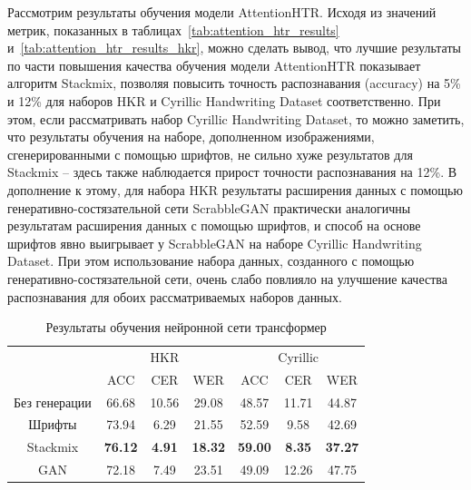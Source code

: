 Рассмотрим результаты обучения модели AttentionHTR.
Исходя из значений метрик, показанных в таблицах~\ref{tab:attention_htr_results} и~\ref{tab:attention_htr_results_hkr},
можно сделать вывод, что лучшие результаты по части повышения качества обучения модели AttentionHTR показывает алгоритм Stackmix,
позволяя повысить точность распознавания (accuracy) на 5\% и 12\% для наборов HKR и Cyrillic Handwriting Dataset соответственно.
При этом, если рассматривать набор Cyrillic Handwriting Dataset, то можно заметить,
что результаты обучения на наборе, дополненном изображениями, сгенерированными с помощью шрифтов,
не сильно хуже результатов для Stackmix -- здесь также наблюдается прирост точности распознавания на 12\%.
В дополнение к этому, для набора HKR результаты расширения данных с помощью генеративно-состязательной сети ScrabbleGAN
практически аналогичны результатам расширения данных с помощью шрифтов, и способ на основе шрифтов явно выигрывает у ScrabbleGAN
на наборе Cyrillic Handwriting Dataset.
При этом использование набора данных, созданного с помощью генеративно-состязательной сети,
очень слабо повлияло на улучшение качества распознавания для обоих рассматриваемых наборов данных.

\begin{table}[h!]
    \centering
    \begin{tabular}{|c|c|c|c|c|c|c|}
        \hline
              & \multicolumn{3}{c|}{HKR} & \multicolumn{3}{c|}{Cyrillic} \\
        \cline{2-7}
                         &  ACC           &  CER           &  WER           &  ACC           &  CER           &  WER           \\
        \hline
        \hline
        Без генерации    & 66.68          & 10.56          & 29.08          & 48.57          & 11.71          & 44.87          \\
        Шрифты           & 73.94          & 6.29           & 21.55          & 52.59          & 9.58           & 42.69          \\
        Stackmix         & \textbf{76.12} & \textbf{4.91}  & \textbf{18.32} & \textbf{59.00} & \textbf{8.35}  & \textbf{37.27} \\
        GAN              & 72.18          & 7.49           & 23.51          & 49.09          & 12.26          & 47.75          \\
        \hline
    \end{tabular}
    \caption{Результаты обучения нейронной сети трансформер}
    \label{tab:transformer_htr_results}
\end{table}


